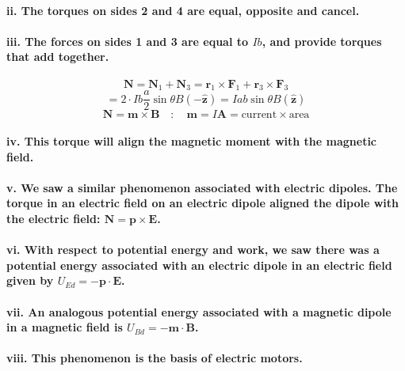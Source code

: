 \documentclass{article}
\begin{document}
\paragraph{\indent\indent ii. The torques on sides 2 and 4 are equal, opposite and cancel.}
\paragraph{\indent\indent iii. The forces on sides 1 and 3 are equal to $Ib$, and provide torques that add together.}
\begin{equation*}
    \boldsymbol{N}=\boldsymbol{N}_1+\boldsymbol{N}_3=\boldsymbol{r}_1\times\boldsymbol{F}_1+\boldsymbol{r}_3\times\boldsymbol{F}_3
\end{equation*}
\begin{equation*}
    =2\cdot Ib\frac{a}{2}\sin\theta B(-\hat{\boldsymbol{z}})=Iab\sin\theta B(\hat{\boldsymbol{z}})
\end{equation*}
\begin{equation*}
    \boldsymbol{N}=\boldsymbol{m}\times\boldsymbol{B}\quad :\quad \boldsymbol{m}=I\boldsymbol{A}=\text{current}\times\text{area}
\end{equation*}
\paragraph{\indent\indent iv. This torque will align the magnetic moment with the magnetic field.}
\paragraph{\indent\indent v. We saw a similar phenomenon associated with electric dipoles. The torque in an electric field on an electric dipole aligned the dipole with the electric field: $\boldsymbol{N}=\boldsymbol{p}\times\boldsymbol{E}$.}
\paragraph{\indent\indent vi. With respect to potential energy and work, we saw there was a potential energy associated with an electric dipole in an electric field given by $U_{Ed}=-\boldsymbol{p}\cdot\boldsymbol{E}$.}
\paragraph{\indent\indent vii. An analogous potential energy associated with a magnetic dipole in a magnetic field is $U_{Bd}=-\boldsymbol{m}\cdot\boldsymbol{B}$.}
\paragraph{\indent\indent viii. This phenomenon is the basis of electric motors.}
\end{document}
